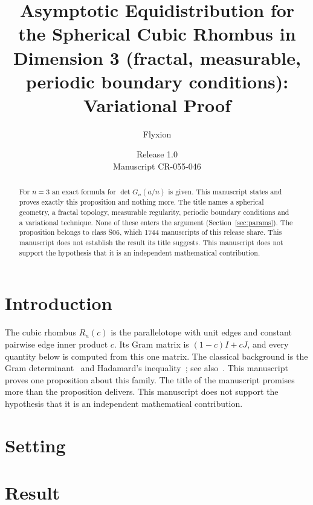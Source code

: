 \documentclass[11pt]{article}
\title{Asymptotic Equidistribution for the Spherical Cubic Rhombus in Dimension 3 (fractal, measurable, periodic boundary conditions): Variational Proof}
\author{Flyxion}
\date{Release 1.0\\ Manuscript CR-055-046}
\begin{document}
\maketitle
\begin{abstract}
For $n=3$ an exact formula for $\det G_n(a/n)$ is given. This manuscript states and proves exactly this proposition and nothing more. The title names a spherical geometry, a fractal topology, measurable regularity, periodic boundary conditions and a variational technique. None of these enters the argument (Section~\ref{sec:params}). The proposition belongs to class S06, which 1744 manuscripts of this release share. This manuscript does not establish the result its title suggests. This manuscript does not support the hypothesis that it is an independent mathematical contribution.
\end{abstract}

\section{Introduction}
The cubic rhombus $R_n(c)$ is the parallelotope with unit edges and constant pairwise edge inner product $c$. Its Gram matrix is $(1-c)I+cJ$, and every quantity below is computed from this one matrix. The classical background is the Gram determinant~\cite{gram} and Hadamard's inequality~\cite{hadamard}; see also~\cite{hj}.
This manuscript proves one proposition about this family. The title of the manuscript promises more than the proposition delivers. This manuscript does not support the hypothesis that it is an independent mathematical contribution.

\section{Setting}


\section{Result}

\end{document}
